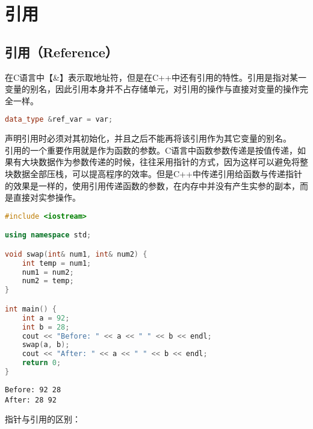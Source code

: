 \newpage

\section{引用}

\subsection{引用（Reference）}

在C语言中【\&】表示取地址符，但是在C++中还有引用的特性。引用是指对某一变量的别名，因此引用本身并不占存储单元，对引用的操作与直接对变量的操作完全一样。

\vspace{-0.5cm}

\begin{lstlisting}[language=C++]
data_type &ref_var = var;
\end{lstlisting}

声明引用时必须对其初始化，并且之后不能再将该引用作为其它变量的别名。\\

引用的一个重要作用就是作为函数的参数。C语言中函数参数传递是按值传递，如果有大块数据作为参数传递的时候，往往采用指针的方式，因为这样可以避免将整块数据全部压栈，可以提高程序的效率。但是C++中传递引用给函数与传递指针的效果是一样的，使用引用传递函数的参数，在内存中并没有产生实参的副本，而是直接对实参操作。\\


\begin{lstlisting}[language=C++]
#include <iostream>

using namespace std;

void swap(int& num1, int& num2) {
    int temp = num1;
    num1 = num2;
    num2 = temp;
}

int main() {
    int a = 92;
    int b = 28;
    cout << "Before: " << a << " " << b << endl;
    swap(a, b);
    cout << "After: " << a << " " << b << endl;
    return 0;
}
\end{lstlisting}

\begin{tcolorbox}
	\begin{verbatim}
Before: 92 28
After: 28 92
	\end{verbatim}
\end{tcolorbox}

指针与引用的区别：

